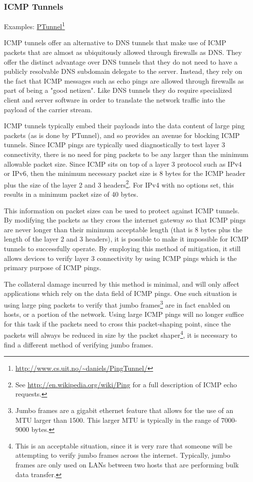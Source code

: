 \documentclass{article}
\newcommand{\hreff}[2]{\href{#1}{#2}\footnote{\url{#1}}}
\theoremstyle{remark}
\theoremstyle{definition}
\theoremstyle{definition}
\theoremstyle{definition}
\begin{document}
\subsubsection{ICMP Tunnels}
Examples: \hreff{http://www.cs.uit.no/~daniels/PingTunnel/}{PTunnel}

ICMP tunnels offer an alternative to DNS tunnels that make use of ICMP packets that are almost as ubiquitously allowed through firewalls as DNS. They offer the distinct advantage over DNS tunnels that they do not need to have a publicly resolvable DNS subdomain delegate to the server. Instead, they rely on the fact that ICMP messages such as echo pings are allowed through firewalls as part of being a "good netizen". Like DNS tunnels they do require specialized client and server software in order to translate the network traffic into the payload of the carrier stream.

ICMP tunnels typically embed their payloads into the data content of large ping packets (as is done by PTunnel), and so provides an avenue for blocking ICMP tunnels. Since ICMP pings are typically used diagnostically to test layer 3 connectivity, there is no need for ping packets to be any larger than the minimum allowable packet size. Since ICMP sits on top of a layer 3 protocol such as IPv4 or IPv6, then the minimum necessary packet size is 8 bytes for the ICMP header plus the size of the layer 2 and 3 headers\footnote{See \url{http://en.wikipedia.org/wiki/Ping} for a full description of ICMP echo requests.}. For IPv4 with no options set, this results in a minimum packet size of 40 bytes. 

This information on packet sizes can be used to protect against ICMP tunnels. By modifying the packets as they cross the internet gateway so that ICMP pings are never longer than their minimum acceptable length (that is 8 bytes plus the length of the layer 2 and 3 headers), it is possible to make it impossible for ICMP tunnels to successfully operate. By employing this method of mitigation, it still allows devices to verify layer 3 connectivity by using ICMP pings which is the primary purpose of ICMP pings.

The collateral damage incurred by this method is minimal, and will only affect applications which rely on the data field of ICMP pings. One such situation is using large ping packets to verify that jumbo frames\footnote{Jumbo frames are a gigabit ethernet feature that allows for the use of an MTU larger than 1500. This larger MTU is typically in the range of 7000-9000 bytes.} are in fact enabled on hosts, or a portion of the network. Using large ICMP pings will no longer suffice for this task if the packets need to cross this packet-shaping point, since the packets will always be reduced in size by the packet shaper\footnote{This is an acceptable situation, since it is very rare that someone will be attempting to verify jumbo frames across the internet. Typically, jumbo frames are only used on LANs between two hosts that are performing bulk data transfer.}, it is necessary to find a different method of verifying jumbo frames.
\end{document}
